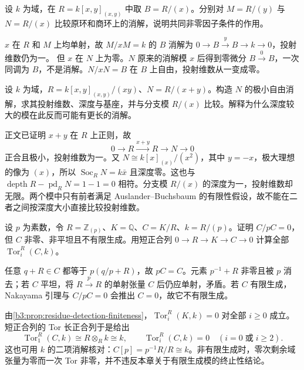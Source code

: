 \begin{exercise}\label{b3:ex:17-basechange-hypothesis}
	设 \(k\) 为域，在 \(R=k[x,y]_{(x,y)}\) 中取 \(B=R/(x)\)。分别对 \(M=R/(y)\) 与 \(N=R/(x)\) 比较原环和商环上的消解，说明共同非零因子条件的作用。
\end{exercise}
\begin{solution}
	\(x\) 在 \(R\) 和 \(M\) 上均单射，故 \(M/xM=k\) 的 \(B\) 消解为 \(0\to B\xrightarrow{y}B\to k\to0\)，投射维数仍为一。 但 \(x\) 在 \(N\) 上为零。\(N\) 原来的消解模 \(x\) 后得到零微分 \(B\xrightarrow{0}B\)，一次同调为 \(B\)，不是消解。\(N/xN=B\) 在 \(B\) 上自由，投射维数从一变成零。
\end{solution}

\begin{exercise}\label{b3:ex:17-node-depth-one}
	设 \(k\) 为域，\(R=k[x,y]_{(x,y)}/(xy)\)、\(N=R/(x+y)\)。构造 \(N\) 的极小自由消解，求其投射维数、深度与基座，并与分支模 \(R/(x)\) 比较。解释为什么深度较大的模在此反而可能有更长的消解。
\end{exercise}
\begin{solution}
	正文已证明 \(x+y\) 在 \(R\) 上正则，故
	\[
		0\longrightarrow R\xrightarrow{x+y}R\longrightarrow N\longrightarrow0
	\]
	正合且极小，投射维数为一。又 \(N\cong k[x]_{(x)}/(x^2)\)，其中 \(y=-x\)，极大理想的像为 \((x)\)，所以 \(\operatorname{Soc}_RN=k\bar x\) 且深度零。这也与 \(\operatorname{depth}R-\operatorname{pd}_RN=1-1=0\) 相符。分支模 \(R/(x)\) 的深度为一，投射维数却无限。两个模中只有前者满足 Auslander–Buchsbaum 的有限性假设，故不能在二者之间按深度大小直接比较投射维数。
\end{solution}

\begin{exercise}\label{b3:ex:17-nonfinite-warning}
	设 \(p\) 为素数，令 \(R=\mathbb Z_{(p)}\)、\(K=\mathbb Q\)、\(C=K/R\)、\(k=R/(p)\)。证明 \(C/pC=0\)，但 \(C\) 非零、非平坦且不有限生成。用短正合列 \(0\to R\to K\to C\to0\) 计算全部 \(\operatorname{Tor}_i^R(C,k)\)。
\end{exercise}
\begin{solution}
	任意 \(q+R\in C\) 都等于 \(p(q/p+R)\)，故 \(pC=C\)。元素 \(p^{-1}+R\) 非零且被 \(p\) 消去；若 \(C\) 平坦，将 \(R\xrightarrow{p}R\) 的单射张量 \(C\) 后仍应单射，矛盾。若 \(C\) 有限生成，Nakayama 引理与 \(C/pC=0\) 会推出 \(C=0\)，故它不有限生成。

	由\cref{b3:prop:residue-detection-finiteness}，\(\operatorname{Tor}_i^R(K,k)=0\) 对全部 \(i\ge0\) 成立。短正合列的 Tor 长正合列于是给出
	\[
		\operatorname{Tor}_1^R(C,k)\cong R\otimes_Rk\cong k,\qquad \operatorname{Tor}_i^R(C,k)=0\quad(i=0\;\text{或}\;i\ge2).
	\]
	这也可用 \(k\) 的二项消解核对：\(C[p]=p^{-1}R/R\cong k\)。非有限生成时，零次剩余域张量为零而一次 Tor 非零，并不违反本章关于有限生成模的终止性结论。
\end{solution}

